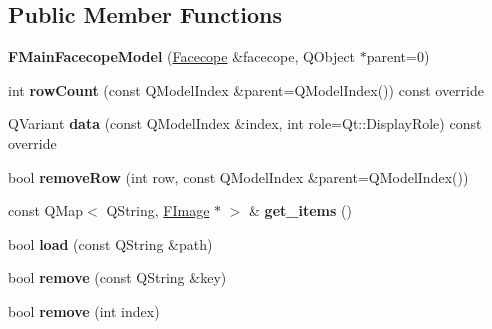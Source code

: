 \subsection*{Public Member Functions}
\begin{DoxyCompactItemize}
\item 
\mbox{\label{classFMainFacecopeModel_a978bd3890e0639437639d1c3a93c8f92}} 
{\bfseries F\+Main\+Facecope\+Model} (\hyperlink{structFacecope}{Facecope} \&facecope, Q\+Object $\ast$parent=0)
\item 
\mbox{\label{classFMainFacecopeModel_a2963e38095e5b333887d5e40a29e97c4}} 
int {\bfseries row\+Count} (const Q\+Model\+Index \&parent=Q\+Model\+Index()) const override
\item 
\mbox{\label{classFMainFacecopeModel_aed374733f42dc4431adae47c67a5c536}} 
Q\+Variant {\bfseries data} (const Q\+Model\+Index \&index, int role=Qt\+::\+Display\+Role) const override
\item 
\mbox{\label{classFMainFacecopeModel_ae1554769d52e9759c3d083014490b9e5}} 
bool {\bfseries remove\+Row} (int row, const Q\+Model\+Index \&parent=Q\+Model\+Index())
\item 
\mbox{\label{classFMainFacecopeModel_aa7044acf807fae60da413b23d127ae9f}} 
const Q\+Map$<$ Q\+String, \hyperlink{classFImage}{F\+Image} $\ast$ $>$ \& {\bfseries get\+\_\+items} ()
\item 
\mbox{\label{classFMainFacecopeModel_a1e252ebb83462b92197d5dc69262007d}} 
bool {\bfseries load} (const Q\+String \&path)
\item 
\mbox{\label{classFMainFacecopeModel_a0c6aa5e8a388759a1c6c81d4e98ce903}} 
bool {\bfseries remove} (const Q\+String \&key)
\item 
\mbox{\label{classFMainFacecopeModel_acf3adfcfe3736363aee73856dc1fa142}} 
bool {\bfseries remove} (int index)
\item 
\mbox{\label{classFMainFacecopeModel_a9e181078dac81a412706a76f86b0bcce}} 

\end{DoxyCompactItemize}
